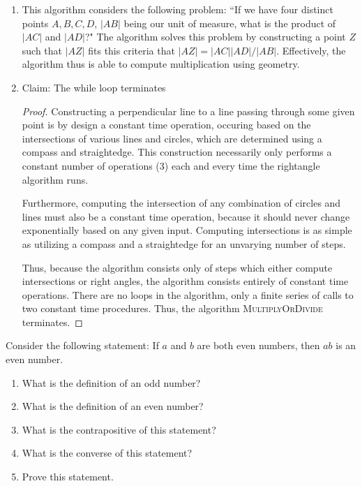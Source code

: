 \documentclass{article}
\begin{document}
\begin{enumerate}
	\item This algorithm considers the following problem: ``If we have four
		distinct points $A,B,C,D$, $|AB|$ being our unit of measure, what is
		the product of $|AC|$ and $|AD|$?" The algorithm solves this problem by
		constructing a point $Z$ such that $|AZ|$ fits this criteria that 
		$|AZ|= |AC||AD|/|AB|$. Effectively, the algorithm thus is able to compute multiplication 
		using geometry.
	\item Claim: The while loop terminates
		\begin{proof}
			Constructing a perpendicular line to a line passing through some given point is by design
			a constant time operation, occuring based on the intersections of various lines and circles,
			which are determined using a compass and straightedge. This construction necessarily only performs
			a constant number of operations (3) each and every time the rightangle algorithm runs.

			Furthermore, computing the intersection of any combination of circles and lines must also be a constant
			time operation, because it should never change exponentially based on any given input. Computing 
			intersections is as simple as utilizing a compass and a straightedge for an unvarying number of steps.

			Thus, because the algorithm consists only of steps which either compute intersections or right angles,
			the algorithm consists entirely of constant time operations. There are no loops in the algorithm, only
			a finite series of calls to two constant time procedures. Thus, the algorithm \textsc{MultiplyOrDivide} terminates.
			
		\end{proof}
\end{enumerate}




\nextprob
Consider the following statement: If $a$ and $b$ are both even numbers, then $ab$ is
an even number.
\begin{enumerate}
    \item What is the definition of an odd number?
    \item What is the definition of an even number?
    \item What is the contrapositive of this statement?
    \item What is the converse of this statement?
    \item Prove this statement.
\end{enumerate}
\end{document}

